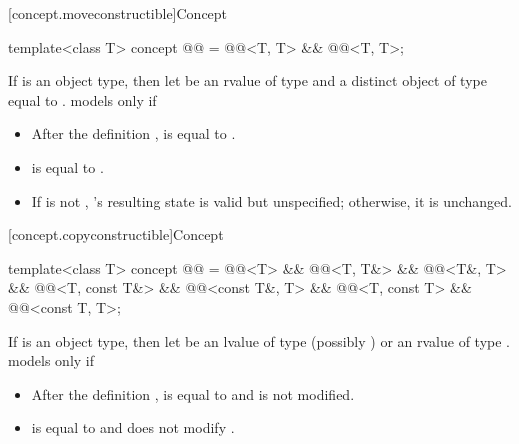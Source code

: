 [concept.moveconstructible]{Concept }

\begin{itemdecl}
template<class T>
  concept @@ = @@<T, T> && @@<T, T>;
\end{itemdecl}

\begin{itemdescr}
\pnum
If  is an object type, then let  be an rvalue of type
 and  a distinct object of type  equal to
.  models  only if
\begin{itemize}
\item After the definition ,  is equal to .

\item {} is equal to .

\item If  is not , 's resulting state is valid
but unspecified; otherwise, it is unchanged.
\end{itemize}
\end{itemdescr}

[concept.copyconstructible]{Concept }

\begin{itemdecl}
template<class T>
  concept @@ =
    @@<T> &&
    @@<T, T&> && @@<T&, T> &&
    @@<T, const T&> && @@<const T&, T> &&
    @@<T, const T> && @@<const T, T>;
\end{itemdecl}

\begin{itemdescr}
\pnum
If  is an object type, then let  be an lvalue of type
(possibly )  or an rvalue of type .
 models  only if
\begin{itemize}
\item After the definition ,
 is equal to  and
 is not modified.

\item {} is equal to  and does not modify .
\end{itemize}
\end{itemdescr}

